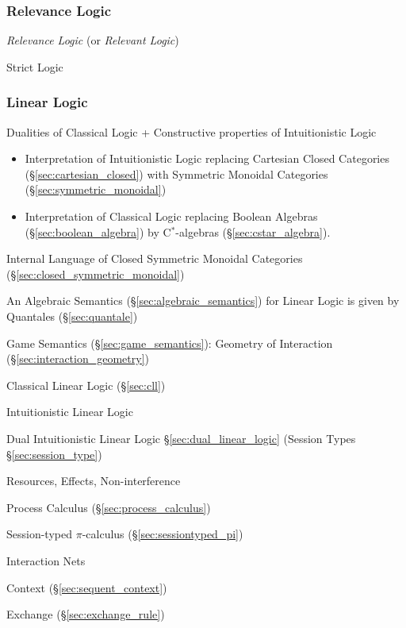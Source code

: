 \subsubsection{Relevance Logic}\label{sec:relevance_logic}

\emph{Relevance Logic} (or \emph{Relevant Logic})

Strict Logic



\subsubsection{Linear Logic}\label{sec:linear_logic}

Dualities of Classical Logic + Constructive properties of
Intuitionistic Logic

\begin{itemize}
\item Interpretation of Intuitionistic Logic replacing Cartesian Closed
  Categories (\S\ref{sec:cartesian_closed}) with Symmetric Monoidal
  Categories (\S\ref{sec:symmetric_monoidal})
\item Interpretation of Classical Logic replacing Boolean Algebras
  (\S\ref{sec:boolean_algebra}) by C$^*$-algebras
  (\S\ref{sec:cstar_algebra}).
\end{itemize}

Internal Language of Closed Symmetric Monoidal Categories
(\S\ref{sec:closed_symmetric_monoidal})

An Algebraic Semantics (\S\ref{sec:algebraic_semantics}) for Linear
Logic is given by Quantales (\S\ref{sec:quantale})

Game Semantics (\S\ref{sec:game_semantics}): Geometry of Interaction
(\S\ref{sec:interaction_geometry})

Classical Linear Logic (\S\ref{sec:cll})

Intuitionistic Linear Logic

Dual Intuitionistic Linear Logic \S\ref{sec:dual_linear_logic}
(Session Types \S\ref{sec:session_type}) \cite{caires-pfenning10}

Resources, Effects, Non-interference \cite{caires-pfenning10}

Process Calculus (\S\ref{sec:process_calculus})

Session-typed $\pi$-calculus (\S\ref{sec:sessiontyped_pi})

Interaction Nets %

Context (\S\ref{sec:sequent_context})

Exchange (\S\ref{sec:exchange_rule})

